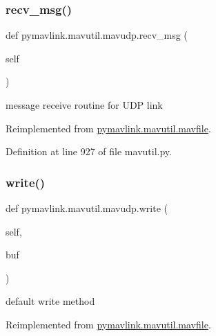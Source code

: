 \mbox{\label{classpymavlink_1_1mavutil_1_1mavudp_aeb1b82765793d5de815c95caf6863953}} 
\subsubsection{\texorpdfstring{recv\_msg()}{recv\_msg()}}
{\footnotesize\ttfamily def pymavlink.\+mavutil.\+mavudp.\+recv\+\_\+msg (\begin{DoxyParamCaption}\item[{}]{self }\end{DoxyParamCaption})}

\begin{DoxyVerb}message receive routine for UDP link\end{DoxyVerb}
 

Reimplemented from \mbox{\hyperlink{classpymavlink_1_1mavutil_1_1mavfile_acf32945bf305666d12d8a1bf32ae6893}{pymavlink.\+mavutil.\+mavfile}}.



Definition at line 927 of file mavutil.\+py.

\mbox{\label{classpymavlink_1_1mavutil_1_1mavudp_a517fd3e5a3ad03f03ba505ff8b4d7572}} 
\subsubsection{\texorpdfstring{write()}{write()}}
{\footnotesize\ttfamily def pymavlink.\+mavutil.\+mavudp.\+write (\begin{DoxyParamCaption}\item[{}]{self,  }\item[{}]{buf }\end{DoxyParamCaption})}

\begin{DoxyVerb}default write method\end{DoxyVerb}
 

Reimplemented from \mbox{\hyperlink{classpymavlink_1_1mavutil_1_1mavfile_a8f40348c156083384c07dfa73cf92a62}{pymavlink.\+mavutil.\+mavfile}}.



